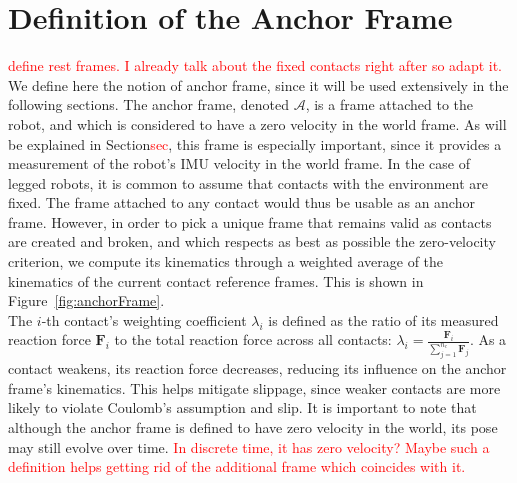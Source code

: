 \documentclass{IJCAS}
\begin{document}
\section{Definition of the Anchor Frame}
\textcolor{red}{define rest frames. I already talk about the fixed contacts right after so adapt it.}
We define here the notion of anchor frame, since it will be used extensively in the following sections. The anchor frame, denoted $\mathcal{A}$, is a frame attached to the robot, and which is considered to have a zero velocity in the world frame. As will be explained in Section\textcolor{red}{sec}, this frame is especially important, since it provides a measurement of the robot's IMU velocity in the world frame. In the case of legged robots, it is common to assume that contacts with the environment are fixed. The frame attached to any contact would thus be usable as an anchor frame. However, in order to pick a unique frame that remains valid as contacts are created and broken, and which respects as best as possible the zero-velocity criterion, we compute its kinematics through a weighted average of the kinematics of the current contact reference frames. This is shown in Figure~\ref{fig:anchorFrame}. \\
The $i$-th contact's weighting coefficient $\lambda_{i}$ is defined as the ratio of its measured reaction force $\boldsymbol{F}_{i}$ to the total reaction force across all contacts: $\lambda_{i}=\frac{\boldsymbol{F}_{i}}{\sum^{n_{c}}_{j=1}\boldsymbol{F}_{j}}$. As a contact weakens, its reaction force decreases, reducing its influence on the anchor frame's kinematics. This helps mitigate slippage, since weaker contacts are more likely to violate Coulomb's assumption and slip. It is important to note that although the anchor frame is defined to have zero velocity in the world, its pose may still evolve over time. \textcolor{red}{In discrete time, it has zero velocity? Maybe such a definition helps getting rid of the additional frame which coincides with it.}
\end{document}
